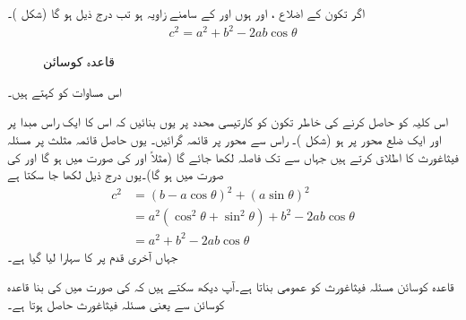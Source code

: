 اگر تکون  کے اضلاع ،  اور  ہوں اور  کے سامنے  زاویہ  ہو تب درج ذیل ہو گا (شکل )۔
\begin{align}
c^2=a^2+b^2-2ab\cos \theta
\end{align}
%
\begin{figure}
\centering
{}
\caption{قاعدہ کوسائن}
\label{شکل_ابتدا_قاعدہ_کوسائن}
\end{figure}
اس مساوات کو  کہتے ہیں۔

اس کلیہ کو حاصل کرنے کی خاطر تکون کو کارتیسی محدد پر یوں بنائیں کہ اس کا ایک راس مبدا پر اور ایک ضلع  محور پر ہو (شکل )۔ راس  سے  محور پر قائمہ گرائیں۔ یوں حاصل قائمہ مثلث  پر مسئلہ فیثاغورث کا اطلاق کرتے ہیں جہاں   سے  تک فاصلہ  لکھا جائے گا (مثلاً  اور  کی صورت میں  ہو گا اور  کی صورت میں  ہو گا)۔یوں درج ذیل لکھا جا سکتا ہے
\begin{align*}
c^2&=(b-a\cos\theta)^2+(a\sin\theta)^2\\
&=a^2(\cos^2\theta+\sin^2\theta)+b^2-2ab\cos\theta\\
&=a^2+b^2-2ab\cos\theta
\end{align*}
جہاں آخری قدم پر  کا سہارا لیا گیا ہے۔

قاعدہ کوسائن مسئلہ فیثاغورث کو عمومی بناتا ہے۔آپ دیکھ سکتے ہیں کہ  کی صورت میں  کی بنا قاعدہ کوسائن سے   یعنی مسئلہ فیثاغورث  حاصل ہوتا ہے۔

\\

